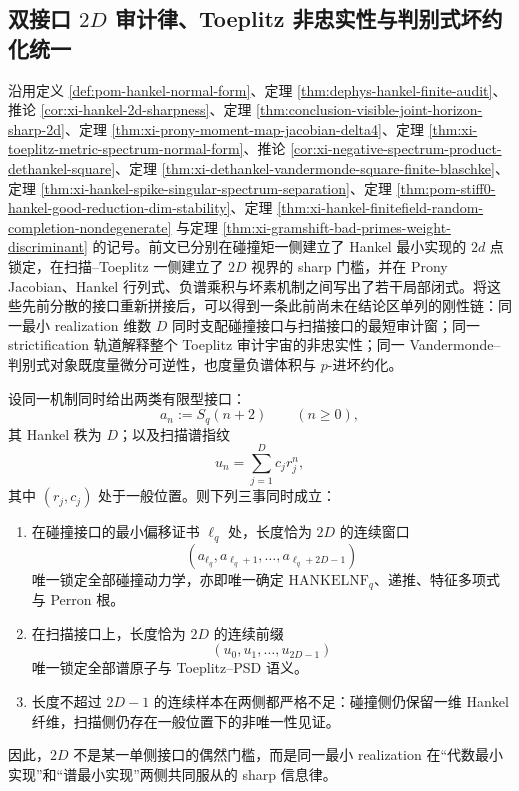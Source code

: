 \subsection{双接口 \texorpdfstring{$2D$}{2D} 审计律、Toeplitz 非忠实性与判别式坏约化统一}\label{subsec:conclusion-dualinterface-2d-toeplitz-prony-discriminant-badreduction}
沿用定义 \ref{def:pom-hankel-normal-form}、定理 \ref{thm:dephys-hankel-finite-audit}、推论 \ref{cor:xi-hankel-2d-sharpness}、定理 \ref{thm:conclusion-visible-joint-horizon-sharp-2d}、定理 \ref{thm:xi-prony-moment-map-jacobian-delta4}、定理 \ref{thm:xi-toeplitz-metric-spectrum-normal-form}、推论 \ref{cor:xi-negative-spectrum-product-dethankel-square}、定理 \ref{thm:xi-dethankel-vandermonde-square-finite-blaschke}、定理 \ref{thm:xi-hankel-spike-singular-spectrum-separation}、定理 \ref{thm:pom-stiff0-hankel-good-reduction-dim-stability}、定理 \ref{thm:xi-hankel-finitefield-random-completion-nondegenerate} 与定理 \ref{thm:xi-gramshift-bad-primes-weight-discriminant} 的记号。前文已分别在碰撞矩一侧建立了 Hankel 最小实现的 \(2d\) 点锁定，在扫描--Toeplitz 一侧建立了 \(2D\) 视界的 sharp 门槛，并在 Prony Jacobian、Hankel 行列式、负谱乘积与坏素机制之间写出了若干局部闭式。将这些先前分散的接口重新拼接后，可以得到一条此前尚未在结论区单列的刚性链：同一最小 realization 维数 \(D\) 同时支配碰撞接口与扫描接口的最短审计窗；同一 strictification 轨道解释整个 Toeplitz 审计宇宙的非忠实性；同一 Vandermonde--判别式对象既度量微分可逆性，也度量负谱体积与 \(p\)-进坏约化。

\begin{theorem}\label{thm:conclusion-dualinterface-universal-2d-audit-law}
设同一机制同时给出两类有限型接口：
\[
a_n:=S_q(n+2)\qquad(n\ge 0),
\]
其 Hankel 秩为 \(D\)；以及扫描谱指纹
\[
u_n=\sum_{j=1}^{D}c_j r_j^n,
\]
其中 \((r_j,c_j)\) 处于一般位置。则下列三事同时成立：
\begin{enumerate}
  \item 在碰撞接口的最小偏移证书 \(\ell_q\) 处，长度恰为 \(2D\) 的连续窗口
  \[
  (a_{\ell_q},a_{\ell_q+1},\dots,a_{\ell_q+2D-1})
  \]
  唯一锁定全部碰撞动力学，亦即唯一确定 \(\mathrm{HANKELNF}_q\)、递推、特征多项式与 Perron 根。
  \item 在扫描接口上，长度恰为 \(2D\) 的连续前缀
  \[
  (u_0,u_1,\dots,u_{2D-1})
  \]
  唯一锁定全部谱原子与 Toeplitz--PSD 语义。
  \item 长度不超过 \(2D-1\) 的连续样本在两侧都严格不足：碰撞侧仍保留一维 Hankel 纤维，扫描侧仍存在一般位置下的非唯一性见证。
\end{enumerate}
因此，\(2D\) 不是某一单侧接口的偶然门槛，而是同一最小 realization 在“代数最小实现”和“谱最小实现”两侧共同服从的 sharp 信息律。
\end{theorem}


